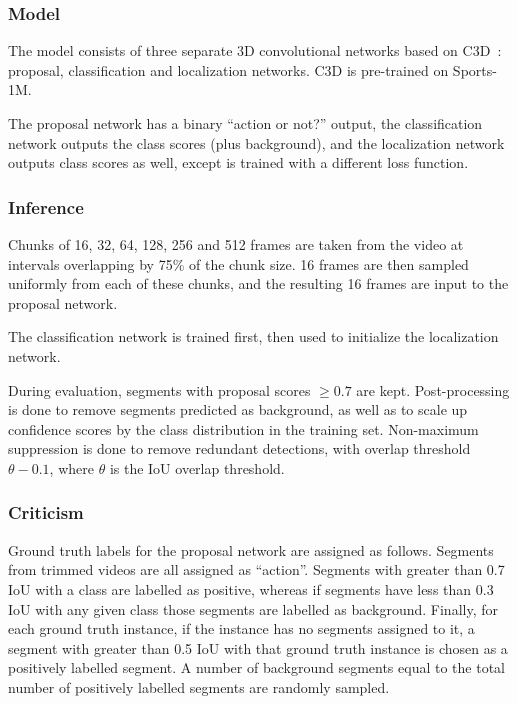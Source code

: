 \documentclass[a4paper, 12pt]{article}
\begin{document}
\subsubsection{Model}

The model consists of three separate 3D convolutional networks based
on C3D~\citet{DBLP:journals/corr/TranBFTP14}: proposal, classification and
localization networks. C3D is pre-trained on Sports-1M.

The proposal network has a binary ``action or not?'' output, the classification
network outputs the class scores (plus background), and the localization
network outputs class scores as well, except is trained with a different loss
function.

\subsubsection{Inference}

Chunks of 16, 32, 64, 128, 256 and 512 frames are taken from the video at
intervals overlapping by 75\% of the chunk size. 16 frames are then sampled
uniformly from each of these chunks, and the resulting 16 frames are input to
the proposal network.

The classification network is trained first, then used to initialize the
localization network.

During evaluation, segments with proposal scores $\geq 0.7$ are kept.
Post-processing is done to remove segments predicted as background, as well as
to scale up confidence scores by the class distribution in the training set.
Non-maximum suppression is done to remove redundant detections, with overlap
threshold $\theta - 0.1$, where $\theta$ is the IoU overlap threshold.

\subsubsection{Criticism}

Ground truth labels for the proposal network are assigned as follows. Segments
from trimmed videos are all assigned as ``action''. Segments with greater than
0.7 IoU with a class are labelled as positive, whereas if segments have less
than 0.3 IoU with any given class those segments are labelled as background.
Finally, for each ground truth instance, if the instance has no segments
assigned to it, a segment with greater than 0.5 IoU with that ground truth
instance is chosen as a positively labelled segment. A number of background
segments equal to the total number of positively labelled segments are randomly
sampled.
\end{document}
